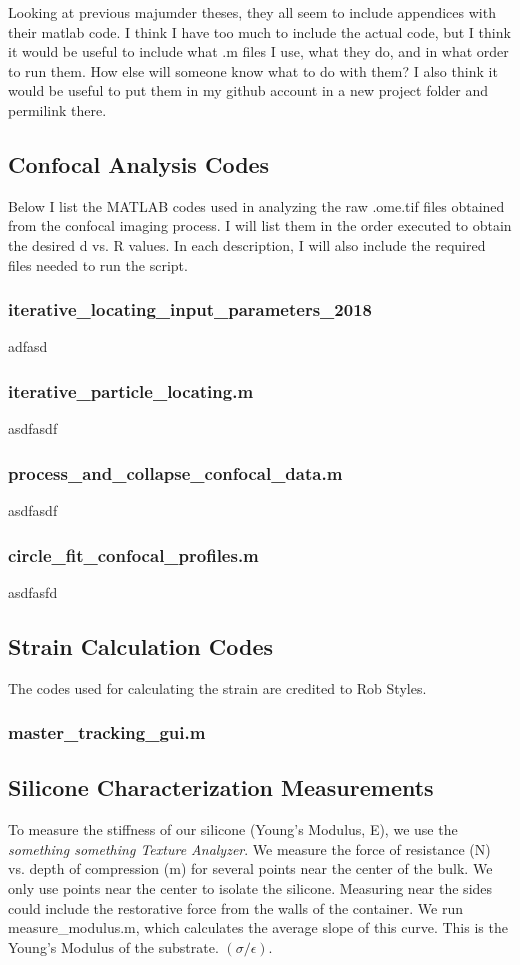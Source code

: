Looking at previous majumder theses, they all seem to include appendices with their matlab code. I think I have too much to include the actual code, but I think it would be useful to include what .m files I use, what they do, and in what order to run them. How else will someone know what to do with them? I also think it would be useful to put them in my github account in a new project folder and permilink there.

\subsection{Confocal Analysis Codes}
Below I list the MATLAB codes used in analyzing the raw .ome.tif files obtained from the confocal imaging process. I will list them in the order executed to obtain the desired d vs. R values. In each description, I will also include the required files needed to run the script.

\subsubsection*{iterative\_locating\_input\_parameters\_2018}
adfasd
\subsubsection*{iterative\_particle\_locating.m}
asdfasdf
\subsubsection*{process\_and\_collapse\_confocal\_data.m}
asdfasdf
\subsubsection*{circle\_fit\_confocal\_profiles.m}
asdfasfd

\subsection{Strain Calculation Codes}
The codes used for calculating the strain are credited to Rob Styles.  

\subsubsection{master\_tracking\_gui.m}


\subsection{Silicone Characterization Measurements}
To measure the stiffness of our silicone (Young's Modulus, E), we use the \emph{something something Texture Analyzer}. We measure the force of resistance (N) vs. depth of compression (m) for several points near the center of the bulk. We only use points near the center to isolate the silicone. Measuring near the sides could include the restorative force from the walls of the container. We run \textsf{measure\_modulus.m}, which calculates the average slope of this curve. This is the Young's Modulus of the substrate.  $(\sigma/\epsilon)$.